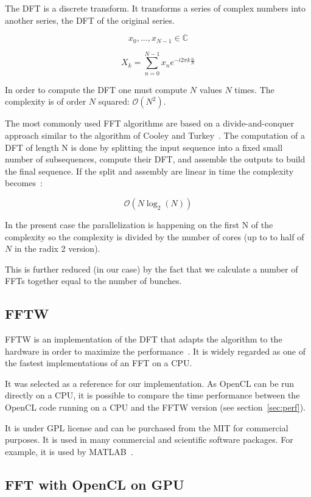 The \gls{DFT} is a discrete transform. It transforms a series of complex numbers into another series, the \gls{DFT} of the original series.

$$ x_0,...,x_{N -1} \in \mathbb{C} $$

$$ X_{k} = \displaystyle\sum\limits_{n = 0}^{N -1} x_{n}e^{-i 2 \pi k \frac{n}{N}} $$

In order to compute the \gls{DFT} one must compute $N$ values $N$ times. The complexity is of order $N$ squared: $ \mathcal{O}(N^{2}) $.

The most commonly used \gls{FFT} algorithms are based on a divide-and-conquer approach similar to the algorithm of Cooley and Turkey~\cite{Cooley65}. The computation of a \gls{DFT} of length N is done by splitting the input sequence into a fixed small number of subsequences, compute their \gls{DFT}, and assemble the outputs to build the final sequence. If the split and assembly are linear in time the complexity becomes~:

$$ \mathcal{O}(N \log_{2}(N)) $$

In the present case the parallelization is happening on the first N of the complexity so the complexity is divided by the number of cores (up to to half of $N$ in the radix 2 version). 

This is further reduced (in our case) by the fact that we calculate a number of \glspl{FFT} together equal to the number of bunches.

\subsection{FFTW}

\Gls{FFTW} is an implementation of the \gls{DFT} that adapts the algorithm to the hardware in order to maximize the performance~\cite{fftw05}. It is widely regarded as one of the fastest implementations of an \gls{FFT} on a \gls{CPU}.

It was selected as a reference for our implementation. As \gls{OpenCL} can be run directly on a \gls{CPU}, it is possible to compare the time performance between the \gls{OpenCL} code running on a \gls{CPU} and the \gls{FFTW} version (see section~\ref{sec:perf}).

It is under GPL license and can be purchased from the \gls{MIT} for commercial purposes. It is used in many commercial and scientific software packages. For example, it is used by MATLAB~\cite{matlab_fftw}.

\subsection{FFT with OpenCL on GPU}

